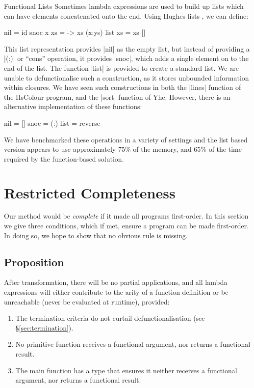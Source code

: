 \documentclass{sigplanconf}
\begin{document}
\begin{examplename}{Functional Lists}
\label{ex:functional_lists}
Sometimes lambda expressions are used to build up lists which can have elements concatenated onto the end. Using Hughes lists \cite{hughes:lists}, we can define:

\begin{code}
nil = id
snoc x xs = \ys -> xs (x:ys)
list xs = xs []
\end{code}

This list representation provides |nil| as the empty list, but instead of providing a |(:)| or ``cons'' operation, it provides |snoc|, which adds a single element on to the end of the list. The function |list| is provided to create a standard list. We are unable to defunctionalise such a construction, as it stores unbounded information within closures. We have seen such constructions in both the |lines| function of the HsColour program, and the |sort| function of Yhc. However, there is an alternative implementation of these functions:

\begin{code}
nil = []
snoc = (:)
list = reverse
\end{code}

We have benchmarked these operations in a variety of settings and the list based version appears to use approximately 75\% of the memory, and 65\% of the time required by the function-based solution.
\end{examplename}


\section{Restricted Completeness}
\label{sec:completeness}

Our method would be \textit{complete} if it made all programs first-order. In this section we give three conditions, which if met, ensure a program can be made first-order. In doing so, we hope to show that no obvious rule is missing.

\subsection{Proposition}

After transformation, there will be no partial applications, and all lambda expressions will either contribute to the arity of a function definition or be unreachable (never be evaluated at runtime), provided:

\begin{enumerate}
\item The termination criteria do not curtail defunctionalisation (see \S\ref{sec:termination}).
\item No primitive function receives a functional argument, nor returns a functional result.
\item The main function has a type that ensures it neither receives a functional argument, nor returns a functional result.
\end{enumerate}
\end{document}

